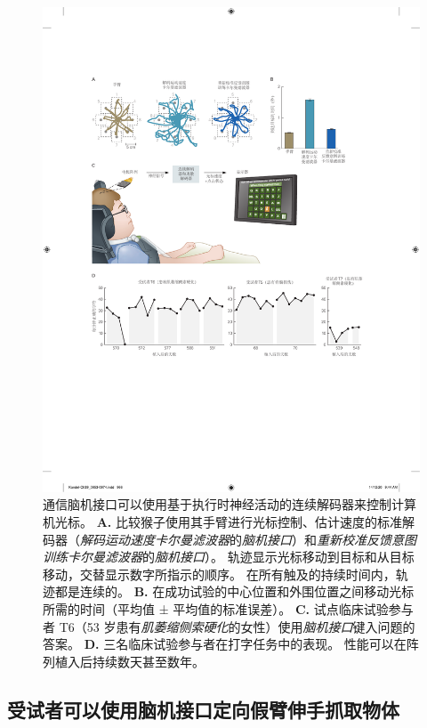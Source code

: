 \begin{figure}[htbp]
	\centering
	\includegraphics[width=1.0\linewidth]{chap39/fig_39_8}
	\caption{通信脑机接口可以使用基于执行时神经活动的连续解码器来控制计算机光标。
		\textbf{A.} 比较猴子使用其手臂进行光标控制、估计速度的标准解码器（\textit{解码运动速度卡尔曼滤波器}的\textit{脑机接口}）和\textit{重新校准反馈意图训练卡尔曼滤波器}的\textit{脑机接口}）。
		轨迹显示光标移动到目标和从目标移动，交替显示数字所指示的顺序。
		在所有触及的持续时间内，轨迹都是连续的\cite{gilja2012high}。
		\textbf{B.} 在成功试验的中心位置和外围位置之间移动光标所需的时间（平均值 ± 平均值的标准误差）\cite{gilja2012high}。 
		\textbf{C.} 试点临床试验参与者 T6（53 岁患有\textit{肌萎缩侧索硬化}的女性）使用\textit{脑机接口}键入问题的答案\cite{pandarinath2017high}。
		\textbf{D.} 三名临床试验参与者在打字任务中的表现。
		性能可以在阵列植入后持续数天甚至数年\cite{pandarinath2017high}。}
	\label{fig:39_8}
\end{figure}



\subsection{受试者可以使用脑机接口定向假臂伸手抓取物体}


